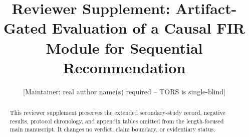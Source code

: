 \documentclass[acmsmall,screen]{acmart}
\begin{document}
\title[Reviewer supplement]{Reviewer Supplement: Artifact-Gated Evaluation of a Causal FIR Module for Sequential Recommendation}
\author{[Maintainer: real author name(s) required -- TORS is single-blind]}
\renewcommand{\shortauthors}{[Maintainer: short author list]}

\begin{abstract}
This reviewer supplement preserves the extended secondary-study record, negative
results, protocol chronology, and appendix tables omitted from the length-focused
main manuscript. It changes no verdict, claim boundary, or evidentiary status.
\end{abstract}

\maketitle


\appendix






\end{document}
